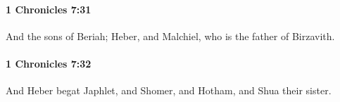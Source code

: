 		\paragraph{1 Chronicles 7:31} %
			\label{1CHRONICLES-7-31}

			And the sons of Beriah; Heber, and Malchiel, who is the father of Birzavith.


		\paragraph{1 Chronicles 7:32} %
			\label{1CHRONICLES-7-32}

			And Heber begat Japhlet, and Shomer, and Hotham, and Shua their sister.


